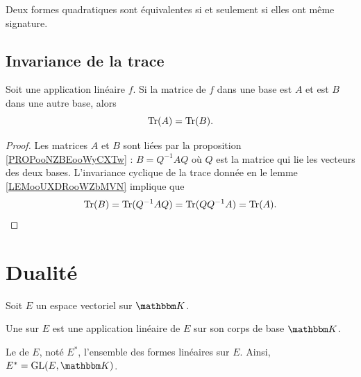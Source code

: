 \begin{proposition}
    Deux formes quadratiques sont équivalentes si et seulement si elles ont même signature.
\end{proposition}


\subsection{Invariance de la trace}

\begin{proposition}      \label{PROPooRMYQooWkEpJJ}
    Soit une application linéaire \( f\). Si la matrice de \( f\) dans une base est \( A\) et est \( B\) dans une autre base, alors
    \begin{equation}
        \operatorname{Tr}(A)=\operatorname{Tr}(B).
    \end{equation}
\end{proposition}

\begin{proof}
    Les matrices \( A\) et \( B\) sont liées par la proposition \ref{PROPooNZBEooWyCXTw} : \( B=Q^{-1}AQ\) où \( Q\) est la matrice qui lie les vecteurs des deux bases. L'invariance cyclique de la trace donnée en le lemme \ref{LEMooUXDRooWZbMVN} implique que
    \begin{equation}
        \operatorname{Tr}(B)=\operatorname{Tr}(Q^{-1}AQ)=\operatorname{Tr}(QQ^{-1}A)=\operatorname{Tr}(A).
    \end{equation}
\end{proof}

\section{Dualité}


\begin{definition}  \label{DefJPGSHpn}
    Soit \( E\) un espace vectoriel sur \( \eK\).

    Une  sur \( E \) est une application linéaire de \( E \) sur son corps de base \( \eK\).

    Le  de \( E\), noté \( E^*\), l'ensemble des formes linéaires sur \( E\). Ainsi, \( E^* = \GL(E,\eK)\).
\end{definition}

